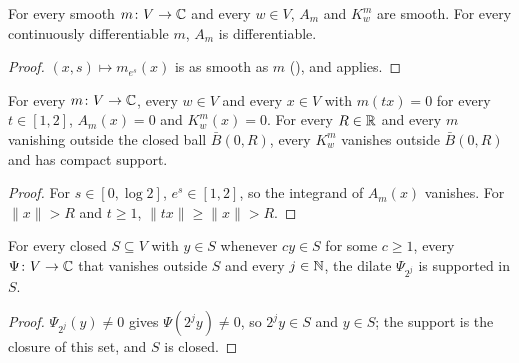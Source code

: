 \begin{lemma}
\label{lem:divergence-kernel-smooth}
\leanok
{}
For every smooth $m \colon V \to \mathbb{C}$ and every $w \in V$, $A_m$ and $K^m_w$ are smooth. For every
continuously differentiable $m$, $A_m$ is differentiable.
\end{lemma}

\begin{proof}
\leanok
$(x, s) \mapsto m_{e^s}(x)$ is as smooth as $m$ (), and
 applies.
\end{proof}

\begin{lemma}
\label{lem:divergence-kernel-support}
\leanok
{}
For every $m \colon V \to \mathbb{C}$, every $w \in V$ and every $x \in V$ with $m(t x) = 0$ for every
$t \in [1, 2]$, $A_m(x) = 0$ and $K^m_w(x) = 0$. For every $R \in \mathbb{R}$ and every $m$ vanishing
outside the closed ball $\bar B(0, R)$, every $K^m_w$ vanishes outside $\bar B(0, R)$ and has
compact support.
\end{lemma}

\begin{proof}
\leanok
For $s \in [0, \log 2]$, $e^s \in [1, 2]$, so the integrand of $A_m(x)$ vanishes. For
$\|x\| > R$ and $t \geq 1$, $\|t x\| \geq \|x\| > R$.
\end{proof}

\begin{lemma}
\label{lem:dyadic-dilate-support}
\leanok
{}
For every closed $S \subseteq V$ with $y \in S$ whenever $c y \in S$ for some $c \geq 1$, every
$\Psi \colon V \to \mathbb{C}$ that vanishes outside $S$ and every $j \in \mathbb{N}$, the dilate $\Psi_{2^j}$ is
supported in $S$.
\end{lemma}

\begin{proof}
\leanok
$\Psi_{2^j}(y) \neq 0$ gives $\Psi(2^j y) \neq 0$, so $2^j y \in S$ and $y \in S$; the support is
the closure of this set, and $S$ is closed.
\end{proof}

